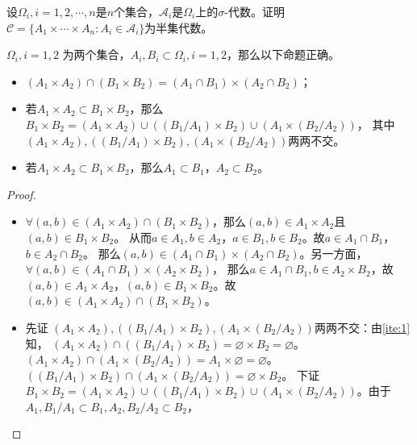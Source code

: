 \documentclass{ctexart}
\begin{document}
\begin{problem}\label{pro:1.4.9}
  设\(\Omega_i ,i=1,2,\cdots,n\)是\(n \)个集合，\(\mathcal{A}_i \)是\(\Omega_i \)上的\(\sigma \)-代数。证明\(\mathcal{C}=\{A_1 \times \cdots \times A_n:A_i \in \mathcal{A}_i\} \)为半集代数。
\end{problem}
\begin{solution}
  \begin{lemma}\label{lem:1.4.9}
    \(\Omega_i,i=1,2 \) 为两个集合，\(A_i,B_i \subset \Omega_i,i=1,2\)，那么以下命题正确。
    \begin{itemize}
      \item \label{ite:1} \((A_1 \times A_2) \cap (B_1 \times B_2)=(A_1 \cap B_1) \times (A_2 \cap B_2) \)；
      \item \label{ite:2} 若\(A_1 \times A_2 \subset B_1 \times B_2 \)，那么\(B_1 \times B_2 = (A_1 \times A_2) \cup ((B_1 / A_1) \times B_2) \cup (A_1 \times (B_2 / A_2)) \)，
        其中\((A_1 \times A_2) , ((B_1 / A_1) \times B_2) , (A_1 \times (B_2 / A_2))\)两两不交。
      \item \label{ite:3} 若\(A_1 \times A_2 \subset B_1 \times B_2 \)，那么\(A_1 \subset B_1 \)，\(A_2 \subset B_2 \)。
    \end{itemize}
  \end{lemma}
 \begin{proof}
   \begin{itemize}
     \item \(\forall (a,b) \in (A_1 \times A_2) \cap (B_1 \times B_2) \)，那么\((a,b) \in A_1 \times A_2 \)且\((a,b) \in B_1 \times B_2 \)。
    从而\(a \in A_1, b \in A_2 \)，\(a \in B_1,b \in B_2 \)。故\(a \in A_1 \cap B_1 \)， \(b \in A_2 \cap B_2 \)。
    那么\((a,b) \in (A_1 \cap B_1) \times (A_2 \cap B_2) \)。另一方面，\(\forall (a,b) \in (A_1 \cap B_1)\times (A_2 \times B_2) \)，
    那么\(a \in A_1 \cap B_1,b \in A_2 \times B_2 \)，故\((a,b) \in A_1 \times A_2 \)，\((a,b) \in B_1 \times B_2 \)。故\((a,b) \in (A_1 \times A_2)\cap (B_1 \times B_2) \)。
  \item 先证 \((A_1 \times A_2) , ((B_1 / A_1) \times B_2) , (A_1 \times (B_2 / A_2))\)两两不交：由\ref{ite:1}知， \((A_1 \times A_2) \cap ((B_1 / A_1)\times B_2)=\varnothing \times B_2 =\varnothing \)。
    \((A_1 \times A_2) \cap (A_1 \times(B_2 / A_2))=A_1 \times \varnothing=\varnothing \)。\(((B_1/A_1)\times B_2)\cap (A_1 \times (B_2 /A_2))= \varnothing \times B_2 \)。
       下证\(B_1 \times B_2 = (A_1 \times A_2) \cup ((B_1 / A_1) \times B_2) \cup (A_1 \times (B_2 / A_2)) \)。由于\(A_1, B_1 / A_1 \subset B_1, A_2, B_2/A_2 \subset B_2 \)，

\end{itemize}
\end{proof}
\end{solution}
\end{document}
